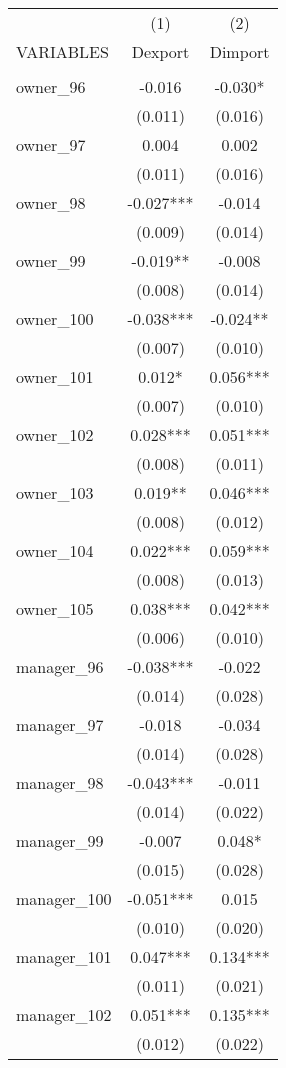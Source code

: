 \begin{tabular}{lcc} \hline
 & (1) & (2) \\
VARIABLES & Dexport & Dimport \\ \hline
 &  &  \\
owner\_96 & -0.016 & -0.030* \\
 & (0.011) & (0.016) \\
owner\_97 & 0.004 & 0.002 \\
 & (0.011) & (0.016) \\
owner\_98 & -0.027*** & -0.014 \\
 & (0.009) & (0.014) \\
owner\_99 & -0.019** & -0.008 \\
 & (0.008) & (0.014) \\
owner\_100 & -0.038*** & -0.024** \\
 & (0.007) & (0.010) \\
owner\_101 & 0.012* & 0.056*** \\
 & (0.007) & (0.010) \\
owner\_102 & 0.028*** & 0.051*** \\
 & (0.008) & (0.011) \\
owner\_103 & 0.019** & 0.046*** \\
 & (0.008) & (0.012) \\
owner\_104 & 0.022*** & 0.059*** \\
 & (0.008) & (0.013) \\
owner\_105 & 0.038*** & 0.042*** \\
 & (0.006) & (0.010) \\
manager\_96 & -0.038*** & -0.022 \\
 & (0.014) & (0.028) \\
manager\_97 & -0.018 & -0.034 \\
 & (0.014) & (0.028) \\
manager\_98 & -0.043*** & -0.011 \\
 & (0.014) & (0.022) \\
manager\_99 & -0.007 & 0.048* \\
 & (0.015) & (0.028) \\
manager\_100 & -0.051*** & 0.015 \\
 & (0.010) & (0.020) \\
manager\_101 & 0.047*** & 0.134*** \\
 & (0.011) & (0.021) \\
manager\_102 & 0.051*** & 0.135*** \\
 & (0.012) & (0.022) \\

\end{tabular}
